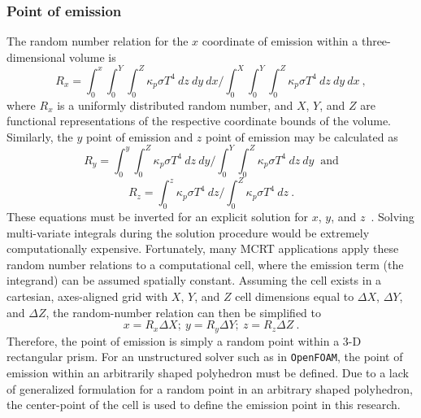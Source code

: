 \subsubsection{Point of emission}
The random number relation for the $x$ coordinate of emission within a three-dimensional volume is
\begin{equation}
    R_x=\int^x_0{\int^Y_0{\int^Z_0{\kappa{}_p\sigma{}T^4~dz}~dy}~dx}\bigg/\int^X_0{\int^Y_0{\int^Z_0{\kappa{}_p\sigma{}T^4~dz}~dy}~dx}~,
    \label{eq:PointOfEmissionX}
\end{equation}
where $R_x$ is a uniformly distributed random number, and $X$, $Y$, and $Z$ are functional representations of the respective coordinate bounds of the volume. Similarly, the $y$ point of emission and $z$ point of emission may be calculated as
\begin{equation}
    R_y=\int^y_0{\int^Z_0{\kappa{}_p\sigma{}T^4~dz}~dy}\bigg/\int^Y_0{\int^Z_0{\kappa{}_p\sigma{}T^4~dz}~dy}~\text{ and}
    \label{eq:PointOfEmissionY}
\end{equation}
\begin{equation}
    R_z=\int^z_0{\kappa{}_p\sigma{}T^4~dz}\bigg/\int^Z_0{\kappa{}_p\sigma{}T^4~dz}~.
    \label{eq:PointOfEmissionZ}
\end{equation}
These equations must be inverted for an explicit solution for $x$, $y$, and $z$~\cite{Modest2022ChapterMediac}. Solving multi-variate integrals during the solution procedure would be extremely computationally expensive.
Fortunately, many MCRT applications apply these random number relations to a computational cell, where the emission term (the integrand) can be assumed spatially constant. 
Assuming the cell exists in a cartesian, axes-aligned grid with $X$, $Y$, and $Z$ cell dimensions equal to $\Delta{}X$, $\Delta{}Y$, and $\Delta{}Z$, the random-number relation can then be simplified to 
\begin{equation}
    x = R_x\Delta{X};~ y = R_y\Delta{Y};~z = R_z\Delta{Z}~.
    \label{eq:PointOfEmission_simplified}
\end{equation}
Therefore, the point of emission is simply a random point within a 3-D rectangular prism.
For an unstructured solver such as in \texttt{OpenFOAM}, the point of emission within an arbitrarily shaped polyhedron must be defined. Due to a lack of generalized formulation for a random point in an arbitrary shaped polyhedron, the center-point of the cell is used to define the emission point in this research.

